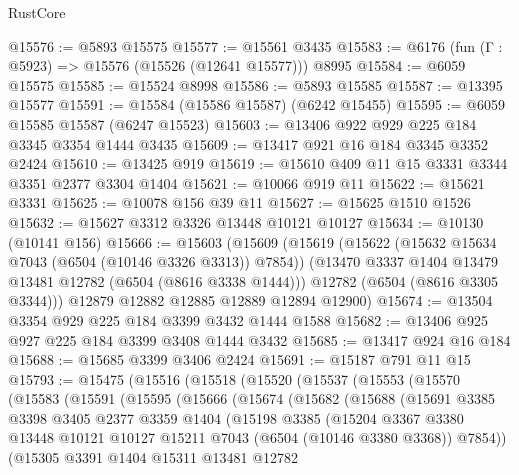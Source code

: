 \begin{lexlean}{RustCore}
\begin{coremodule}
@15576 := @5893 @15575
@15577 := @15561 @3435
@15583 := @6176 (fun (Γ : @5923) => @15576 (@15526 (@12641 @15577))) @8995
@15584 := @6059 @15575
@15585 := @15524 @8998
@15586 := @5893 @15585
@15587 := @13395 @15577
@15591 := @15584 (@15586 @15587) (@6242 @15455)
@15595 := @6059 @15585 @15587 (@6247 @15523)
@15603 := @13406 @922 @929 @225 @184 @3345 @3354 @1444 @3435
@15609 := @13417 @921 @16 @184 @3345 @3352 @2424
@15610 := @13425 @919
@15619 := @15610 @409 @11 @15 @3331 @3344 @3351 @2377 @3304 @1404
@15621 := @10066 @919 @11
@15622 := @15621 @3331
@15625 := @10078 @156 @39 @11
@15627 := @15625 @1510 @1526
@15632 := @15627 @3312 @3326 @13448 @10121 @10127
@15634 := @10130 (@10141 @156)
@15666 := @15603
    (@15609
      (@15619
        (@15622 (@15632 @15634 @7043 (@6504 (@10146 @3326 @3313)) @7854))
        (@13470 @3337 @1404 @13479 @13481 @12782 (@6504 (@8616 @3338 @1444)))
        @12782
        (@6504 (@8616 @3305 @3344)))
      @12879
      @12882
      @12885
      @12889
      @12894
      @12900)
@15674 := @13504 @3354 @929 @225 @184 @3399 @3432 @1444 @1588
@15682 := @13406 @925 @927 @225 @184 @3399 @3408 @1444 @3432
@15685 := @13417 @924 @16 @184
@15688 := @15685 @3399 @3406 @2424
@15691 := @15187 @791 @11 @15
@15793 := @15475
    (@15516
      (@15518
        (@15520
          (@15537
            (@15553
              (@15570
                (@15583
                  (@15591
                    (@15595
                      (@15666
                        (@15674
                          (@15682
                            (@15688
                              (@15691
                                @3385
                                @3398
                                @3405
                                @2377
                                @3359
                                @1404
                                (@15198
                                  @3385
                                  (@15204
                                    @3367
                                    @3380
                                    @13448
                                    @10121
                                    @10127
                                    @15211
                                    @7043
                                    (@6504 (@10146 @3380 @3368))
                                    @7854))
                                (@15305
                                  @3391
                                  @1404
                                  @15311
                                  @13481
                                  @12782

\end{coremodule}
\end{lexlean}
